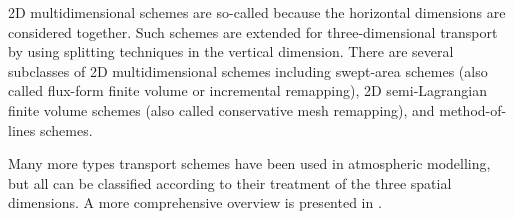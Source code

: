 2D multidimensional schemes are so-called because the horizontal dimensions are considered together.  Such schemes are extended for three-dimensional transport by using splitting techniques in the vertical dimension.
There are several subclasses of 2D multidimensional schemes including swept-area schemes (also called flux-form finite volume or incremental remapping), 2D semi-Lagrangian finite volume schemes (also called conservative mesh remapping), and method-of-lines schemes.

Many more types transport schemes have been used in atmospheric modelling, but all can be classified according to their treatment of the three spatial dimensions.  A more comprehensive overview is presented in \cite{lauritzen2014}.






